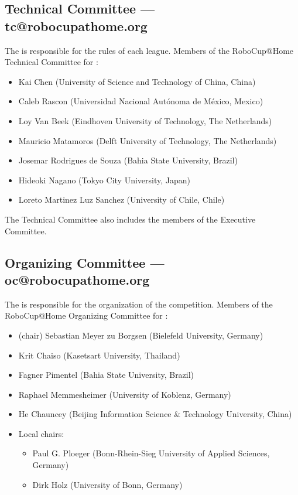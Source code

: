\subsection{Technical Committee --- tc@robocupathome.org}
\label{sec:tc}
The  is responsible for the rules of each league. Members of the RoboCup@Home Technical Committee for \YEAR:
\begin{itemize}
\item Kai Chen (University of Science and Technology of China, China)
\item Caleb Rascon (Universidad Nacional Aut{\'o}noma de M{\'e}xico, Mexico)
\item Loy Van Beek (Eindhoven University of Technology, The Netherlands)
\item Mauricio Matamoros  (Delft University of Technology, The Netherlands)
\item Josemar Rodrigues de Souza (Bahia State University, Brazil)
\item Hideoki Nagano (Tokyo City University, Japan)
\item Loreto Martinez Luz Sanchez (University of Chile, Chile)
\end{itemize}
The Technical Committee also includes the members of the Executive Committee.

\subsection{Organizing Committee --- oc@robocupathome.org}
\label{sec:oc}
The  is responsible for the organization of the competition. Members of the RoboCup@Home Organizing Committee for \YEAR:

\begin{itemize}
\item (chair) Sebastian Meyer zu Borgsen (Bielefeld University, Germany)
\item Krit Chaiso (Kasetsart University, Thailand)
\item Fagner Pimentel (Bahia State University, Brazil)
\item Raphael Memmesheimer (University of Koblenz, Germany)
\item He Chauncey (Beijing Information Science \& Technology University, China)
\item Local chairs:
  \begin{itemize}
    \item Paul G. Ploeger (Bonn-Rhein-Sieg University of Applied Sciences, Germany) 
    \item Dirk Holz (University of Bonn, Germany)
  \end{itemize}
\end{itemize}

